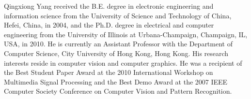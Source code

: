 \documentclass[journal]{IEEEtran}
\begin{document}
\begin{IEEEbiography}{Qingxiong Yang}
received the B.E. degree in
electronic engineering and information science from
the University of Science and Technology of China,
Hefei, China, in 2004, and the Ph.D. degree in electrical and computer engineering from the University
of Illinois at Urbana-Champaign, Champaign, IL,
USA, in 2010. He is currently an Assistant Professor
with the Department of Computer Science, City
University of Hong Kong, Hong Kong. His research
interests reside in computer vision and computer
graphics. He was a recipient of the Best Student
Paper Award at the 2010 International Workshop on Multimedia Signal
Processing and the Best Demo Award at the 2007 IEEE Computer Society
Conference on Computer Vision and Pattern Recognition.
\end{IEEEbiography}
\end{document}
